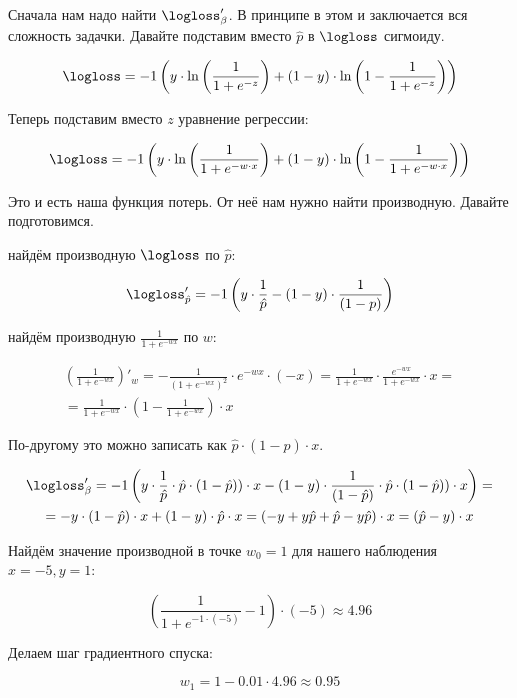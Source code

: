 \begin{sol}
Сначала нам надо найти $\logloss'_{\beta}$. В принципе в этом и заключается вся сложность задачки. Давайте подставим вместо $\hat p $ в $\logloss$ сигмоиду. 

$$
\logloss = -1 \left (y \cdot \ln \left( \frac{1}{1 + e^{-z}} \right)  + (1 - y) \cdot \ln \left ( 1 - \frac{1}{1 + e^{-z}} \right ) \right)
$$
	
Теперь подставим вместо $z$ уравнение регрессии:
	

$$
\logloss = -1 \left (y \cdot \ln \left( \frac{1}{1 + e^{-w \cdot x}} \right)  + (1 - y) \cdot \ln \left ( 1 - \frac{1}{1 + e^{- w \cdot x}} \right ) \right)
$$

Это и есть наша функция потерь.  От неё нам нужно найти производную. Давайте подготовимся. 

 найдём производную $\logloss$ по $\hat p$: 

$$
\logloss'_{\hat p} = -1 \left(y \cdot \frac{1}{\hat p} - (1 - y) \cdot \frac{1}{(1 - p)} \right)
$$

 найдём производную $\frac{1}{1 + e^{-w x}} $ по $w$: 

\begin{multline*}
\left(  \frac{1}{1 + e^{-w x}}   \right)'_{w}  = - \frac{1}{(1 + e^{-w x})^2} \cdot e^{-w x} \cdot (-x) =\frac{1}{1 + e^{-w x}}  \cdot \frac{e^{-w x}}{1 + e^{-w x}} \cdot x  = \\ = \frac{1}{1 + e^{-w x}}  \cdot  \left(1 - \frac{1}{1 + e^{-w x}}  \right) \cdot x
\end{multline*}

По-другому это можно записать как $\hat p \cdot (1 - \hat p) \cdot x$.  


\begin{multline*}
\logloss'_{\beta} = -1 \left(y \cdot \frac{1}{\hat p}  \cdot  \hat p \cdot  \left(1 - \hat p)  \right) \cdot x  - (1 - y) \cdot \frac{1}{(1 - \hat p)} \cdot  \hat p \cdot  \left(1 - \hat p)  \right) \cdot x \right) = \\ =  -y \cdot \left( 1 - \hat p \right) \cdot x + (1 - y) \cdot  \hat p  \cdot x =  (-y + y \hat p  + \hat p - y \hat p ) \cdot x = (\hat p - y) \cdot x
\end{multline*}
	
Найдём значение производной в точке $w_0 = 1$ для нашего наблюдения $x = -5, y=1$: 

$$
\left(\frac{1}{1 + e^{-1 \cdot (-5)}}  - 1 \right) \cdot (-5)  \approx  4.96
$$

Делаем шаг градиентного спуска: 

$$
w_1 = 1 - 0.01 \cdot 4.96 \approx 0.95
$$	
\end{sol} 


